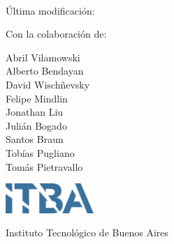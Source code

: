 
\begin{titlepage}
\thispagestyle{empty}

\begin{center}
    \vspace*{1cm}
    
    \Huge
    \textbf{\thetitle}
    
    \vspace{0.25cm}
    \large
    \codigomateria \\
    \vspace{0.25cm}
    \Large
    \cuatrimestre

    \vspace{0.25cm}
    \tiny
    Última modificación: \thedate

    
    \vspace{1.5cm}
    
    \normalsize
    \textbf{\theauthor}

    \medskip

    Con la colaboración de:

    Abril Vilamowski%
    \\%
    Alberto Bendayan%
    \\%
    David Wischñevsky%
    \\%
    Felipe Mindlin%
    \\%
    Jonathan Liu%
    \\%
    Julián Bogado%
    \\%
    Santos Braun%
    \\%
    Tobías Pugliano%
    \\%
    Tomás Pietravallo%
    
    \vfill
    
    \vspace{0.8cm}
    \includegraphics[width=0.25\textwidth]{itba_logo.png}
    
    \vspace{0.8cm}
    
    Instituto Tecnológico de Buenos Aires\\
    
    
\end{center}

\end{titlepage}

\restoregeometry %
